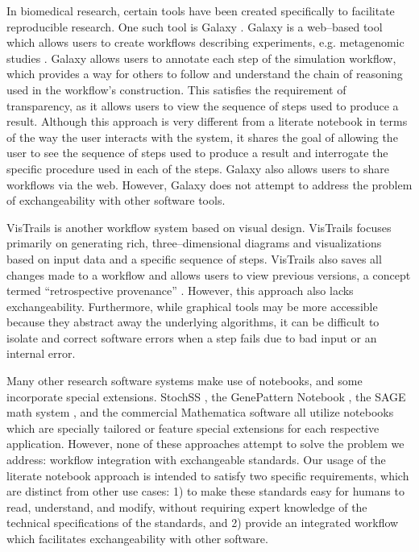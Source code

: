 \documentclass[10pt,letterpaper]{article}
\begin{document}
In biomedical research, certain tools have been created specifically to facilitate reproducible research. One such tool is Galaxy \cite{goecks2010galaxy}. Galaxy is a web--based tool which allows users to create workflows describing experiments, e.g. metagenomic studies \cite{pond2009windshield}. Galaxy allows users to annotate each step of the simulation workflow, which provides a way for others to follow and understand the chain of reasoning used in the workflow's construction. This satisfies the requirement of transparency, as it allows users to view the sequence of steps used to produce a result. Although this approach is very different from a literate notebook in terms of the way the user interacts with the system, it shares the goal of allowing the user to see the sequence of steps used to produce a result and interrogate the specific procedure used in each of the steps. Galaxy also allows users to share workflows via the web. However, Galaxy does not attempt to address the problem of exchangeability with other software tools.

VisTrails \cite{callahan2006vistrails} is another workflow system based on visual design. VisTrails focuses primarily on generating rich, three--dimensional diagrams and visualizations based on input data and a specific sequence of steps. VisTrails also saves all changes made to a workflow and allows users to view previous versions, a concept termed ``retrospective provenance'' \cite{piccolo2016tools}.
However, this approach also lacks exchangeability. Furthermore, while graphical tools may be more accessible because they abstract away the underlying algorithms, it can be difficult to isolate and correct software errors when a step fails due to bad input or an internal error.

Many other research software systems make use of notebooks, and some incorporate special extensions. StochSS \cite{drawert2016stochastic}, the GenePattern Notebook \cite{reich2017genepattern}, the SAGE math system \cite{erocal2010sage}, and the commercial Mathematica software \cite{wolfram1996mathematica} all utilize notebooks which are specially tailored or feature special extensions for each respective application. However, none of these approaches attempt to solve the problem we address: workflow integration with exchangeable standards. Our usage of the literate notebook approach is intended to satisfy two specific requirements, which are distinct from other use cases: 1) to make these standards easy for humans to read, understand, and modify, without requiring expert knowledge of the technical specifications of the standards, and 2) provide an integrated workflow which facilitates exchangeability with other software.
\end{document}
